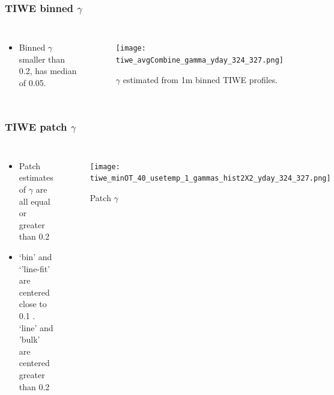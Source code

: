 \documentclass{beamer}
\begin{document}
\begin{frame}
 \frametitle{TIWE binned $\gamma$}

\begin{columns}
\begin{itemize}
\item Binned $\gamma$ smaller than 0.2, has median of 0.05.
\end{itemize}

\begin{figure}[htbp]
\begin{center}
\texttt{[image: tiwe\_avgCombine\_gamma\_yday\_324\_327.png]}
\caption{$\gamma$ estimated from 1m binned TIWE profiles.}
\label{default}
\end{center}
\end{figure}

\end{columns}


\end{frame}


\begin{frame}
 \frametitle{TIWE patch $\gamma$}

\begin{columns}
\begin{itemize}
\item Patch estimates of $\gamma$ are all equal or greater than 0.2
\item `bin' and `'line-fit' are centered close to 0.1 . `line' and 'bulk' are centered greater than 0.2
\end{itemize}

\begin{figure}[htbp]
\begin{center}
\texttt{[image: tiwe\_minOT\_40\_usetemp\_1\_gammas\_hist2X2\_yday\_324\_327.png]}
\caption{Patch $\gamma$}
\label{default}
\end{center}
\end{figure}

\end{columns}


\end{frame}
\end{document}
